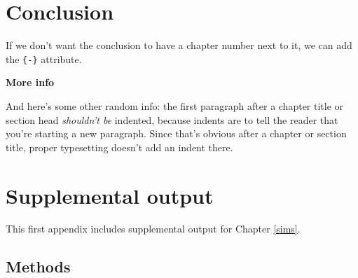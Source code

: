 \documentclass[12pt, twoside]{amherstthesis}
\begin{document}
\hypertarget{conclusion}{%
\chapter*{Conclusion}\label{conclusion}}

If we don't want the conclusion to have a chapter number next to it, we can add the \texttt{\{-\}} attribute.

\textbf{More info}

And here's some other random info: the first paragraph after a chapter title or section head \emph{shouldn't be} indented, because indents are to tell the reader that you're starting a new paragraph. Since that's obvious after a chapter or section title, proper typesetting doesn't add an indent there.

\appendix

\hypertarget{appa}{%
\chapter{Supplemental output}\label{appa}}

This first appendix includes supplemental output for Chapter \ref{sims}.

\hypertarget{suppmethods}{%
\section{Methods}\label{suppmethods}}
\end{document}
